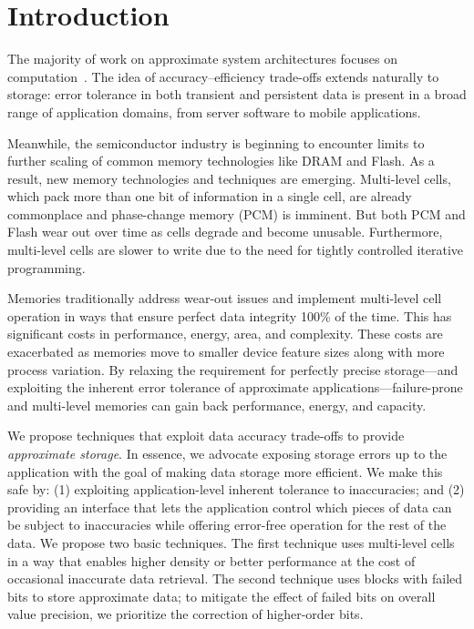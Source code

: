 

\section{Introduction}
\label{approxstorage:sec:intro}

The majority of work on approximate system architectures focuses on
computation~\cite{enerj,truffle,pcmos,stochasticproc,relax,ersa}.
The idea of accuracy--efficiency trade-offs extends naturally to
storage: error tolerance in both transient and persistent data is
present in a broad range of application domains, from server software to
mobile applications.

Meanwhile, the semiconductor industry is beginning to encounter limits to
further scaling of common memory technologies like DRAM and Flash. As a
result, new memory technologies and techniques are emerging. Multi-level cells,
which pack more than one bit of information in a single cell,
are already commonplace and phase-change memory (PCM) is imminent.
But both
PCM and Flash wear out over time as cells degrade and become unusable. Furthermore, multi-level cells
are slower to write due to the need for tightly
controlled iterative programming.

Memories traditionally address wear-out issues and implement multi-level cell
operation in ways that ensure perfect data integrity 100\% of the time. This
has significant costs in performance, energy, area, and complexity. These
costs are exacerbated as memories move to smaller device feature sizes along
with more process variation. By relaxing the requirement for perfectly precise
storage---and exploiting the inherent error tolerance of approximate
applications---failure-prone and multi-level memories can gain back
performance, energy, and capacity.

We propose techniques that exploit data accuracy trade-offs to
provide \emph{approximate storage}. In essence, we advocate exposing storage
errors up to the application with the goal of making data storage more
efficient. We make this safe by: (1) exploiting application-level inherent
tolerance to inaccuracies; and (2) providing an interface that lets the
application control which pieces of data can be subject to inaccuracies while offering error-free operation for the rest of the data.
We propose two basic techniques. The first
technique uses multi-level cells in a way that enables higher density or
better performance at the cost of occasional inaccurate data retrieval. The
second technique uses blocks with failed bits to store approximate data; to
mitigate the effect of failed bits on overall value precision, we prioritize
the correction of higher-order bits.

